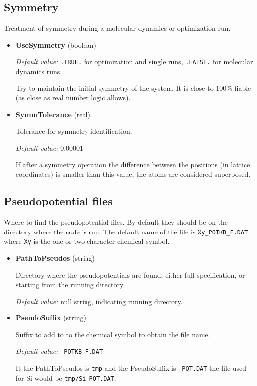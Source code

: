 \documentclass[11pt]{article}
\begin{document}
\subsection{Symmetry}

Treatment of symmetry during a molecular dynamics or optimization run.

\begin{itemize}

\item{\bf UseSymmetry} (boolean)

  \textit{Default value:} \texttt{.TRUE.} for optimization and single
  runs, \texttt{.FALSE.} for molecular dynamics runs.

   Try to maintain the initial symmetry of the system.  It is close to 100\% fiable
   (as close as real number logic allows).

\item{\bf SymmTolerance} (real)

  Tolerance for symmetry identification.

  \textit{Default value:} 0.00001

   If after a symmetry operation the difference between the positions (in lattice coordinates)
   is smaller than this value, the atoms are considered superposed.

\end{itemize}


\subsection{Pseudopotential files}

Where to find the pseudopotential files.  By default they should be on the directory
where the code is run.
The default name of the file is \texttt{Xy{\_}POTKB{\_}F.DAT} where
\texttt{Xy} is the one or two character chemical symbol.

\begin{itemize}

\item{\bf PathToPseudos} (string)

  Directory where the pseudopotentials are found, either full specification,
  or starting from the running directory

  \textit{Default value:}  null string, indicating running directory.


\item{\bf PseudoSuffix} (string)

  Suffix to add to to the chemical symbol to obtain the file name.

  \textit{Default value:}  \texttt{{\_}POTKB{\_}F.DAT}

  It the PathToPseudos is \texttt{tmp} and the PseudoSuffix is \texttt{{\_}POT.DAT}
  the file used for Si would be \texttt{tmp/Si{\_}POT.DAT}.

\end{itemize}
\end{document}
